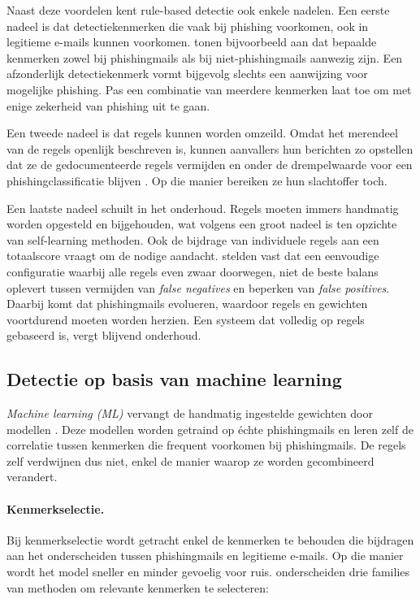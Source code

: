 Naast deze voordelen kent rule-based detectie ook enkele nadelen. Een eerste nadeel is dat detectiekenmerken die vaak bij phishing voorkomen, ook in legitieme e-mails kunnen voorkomen. \textcite{Fette2007} tonen bijvoorbeeld aan dat bepaalde kenmerken zowel bij phishingmails als bij niet-phishingmails aanwezig zijn. Een afzonderlijk detectiekenmerk vormt bijgevolg slechts een aanwijzing voor mogelijke phishing. Pas een combinatie van meerdere kenmerken laat toe om met enige zekerheid van phishing uit te gaan.

Een tweede nadeel is dat regels kunnen worden omzeild. Omdat het merendeel van de regels openlijk beschreven is, kunnen aanvallers hun berichten zo opstellen dat ze de gedocumenteerde regels vermijden en onder de drempelwaarde voor een phishingclassificatie blijven \autocite{Biggio2017}. Op die manier bereiken ze hun slachtoffer toch.

Een laatste nadeel schuilt in het onderhoud. Regels moeten immers handmatig worden opgesteld en bijgehouden, wat volgens \textcite{Sebastiani2001} een groot nadeel is ten opzichte van self-learning methoden. Ook de bijdrage van individuele regels aan een totaalscore vraagt om de nodige aandacht. \textcite{Basnet2012} stelden vast dat een eenvoudige configuratie waarbij alle regels even zwaar doorwegen, niet de beste balans oplevert tussen vermijden van \emph{false negatives} en beperken van \emph{false positives}. Daarbij komt dat phishingmails evolueren, waardoor regels en gewichten voortdurend moeten worden herzien. Een systeem dat volledig op regels gebaseerd is, vergt blijvend onderhoud.

\subsection{Detectie op basis van machine learning}%
\label{subsec:machinelearning-detectie}

\emph{Machine learning (ML)} vervangt de handmatig ingestelde gewichten door modellen \autocite{Salloum2022}. Deze modellen worden getraind op échte phishingmails en leren zelf de correlatie tussen kenmerken die frequent voorkomen bij phishingmails. De regels zelf verdwijnen dus niet, enkel de manier waarop ze worden gecombineerd verandert.

\paragraph{Kenmerkselectie.}
Bij kenmerkselectie wordt getracht enkel de kenmerken te behouden die bijdragen aan het onderscheiden tussen phishingmails en legitieme e-mails. Op die manier wordt het model sneller en minder gevoelig voor ruis. \textcite{Guyon2003} onderscheiden drie families van methoden om relevante kenmerken te selecteren:

